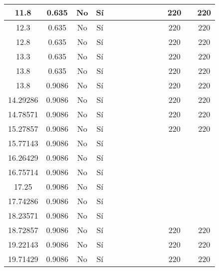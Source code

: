 \begin{table}[H]
{\begin{tabular}{|c|c|c|c|c|c|c|c|c|c|c|c|c|c|}
\hline
11.8 & 0.635 & No  & Sí  &     &     &     &     &     &     &     & 220 &     & 220 \bigstrut\\
\hline
12.3 & 0.635 & No  & Sí  &     &     &     &     &     &     &     & 220 &     & 220 \bigstrut\\
\hline
12.8 & 0.635 & No  & Sí  &     &     &     &     &     &     &     & 220 &     & 220 \bigstrut\\
\hline
13.3 & 0.635 & No  & Sí  &     &     &     &     &     &     &     & 220 &     & 220 \bigstrut\\
\hline
13.8 & 0.635 & No  & Sí  &     &     &     &     &     &     &     & 220 &     & 220 \bigstrut\\
\hline
13.8 & 0.9086 & No  & Sí  &     &     &     &     &     &     &     & 220 &     & 220 \bigstrut\\
\hline
14.29286 & 0.9086 & No  & Sí  &     &     &     &     &     &     &     & 220 &     & 220 \bigstrut\\
\hline
14.78571 & 0.9086 & No  & Sí  &     &     &     &     &     &     &     & 220 &     & 220 \bigstrut\\
\hline
15.27857 & 0.9086 & No  & Sí  &     &     &     &     &     &     &     & 220 &     & 220 \bigstrut\\
\hline
15.77143 & 0.9086 & No  & Sí  &     &     &     &     &     &     &     &     &     &  \bigstrut\\
\hline
16.26429 & 0.9086 & No  & Sí  &     &     &     &     &     &     &     &     &     &  \bigstrut\\
\hline
16.75714 & 0.9086 & No  & Sí  &     &     &     &     &     &     &     &     &     &  \bigstrut\\
\hline
17.25 & 0.9086 & No  & Sí  &     &     &     &     &     &     &     &     &     &  \bigstrut\\
\hline
17.74286 & 0.9086 & No  & Sí  &     &     &     &     &     &     &     &     &     &  \bigstrut\\
\hline
18.23571 & 0.9086 & No  & Sí  &     &     &     &     &     &     &     &     &     &  \bigstrut\\
\hline
18.72857 & 0.9086 & No  & Sí  &     &     &     &     &     &     &     & 220 &     & 220 \bigstrut\\
\hline
19.22143 & 0.9086 & No  & Sí  &     &     &     &     &     &     &     & 220 &     & 220 \bigstrut\\
\hline
19.71429 & 0.9086 & No  & Sí  &     &     &     &     &     &     &     & 220 &     & 220 \bigstrut\\

\end{tabular}}
\end{table}

